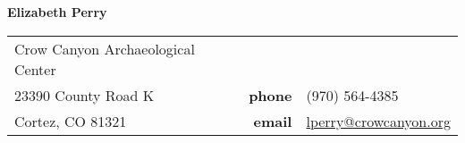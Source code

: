 \vspace{0.1in}

{\bf Elizabeth Perry}
\begin{list1}
\item[]
\begin{tabular}{@{}p{2.75in}rl}

Crow Canyon Archaeological Center   &  &  \\            
23390 County Road K                 & {\bf phone} & (970) 564-4385 \\         
Cortez, CO 81321                    & {\bf email} & \href{mailto: lperry@crowcanyon.org}{lperry@crowcanyon.org}\\
    
\end{tabular}
\end{list1}

%
%
%    


%
%
%

